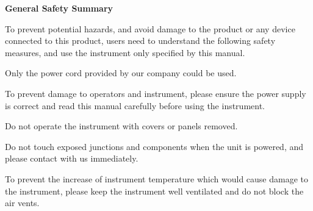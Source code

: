 \noindent\xiaosan\textbf{General Safety Summary}
\vspace{0.7cm}

To prevent potential hazards, and avoid damage to the product or any device connected to this product, users need to understand the following safety measures, and use the instrument only specified by this manual. 

\vspace{0.7cm}
\noindent{}

\vspace{0.2cm}
\hspace{-0.4cm}Only the power cord provided by our company could be used.

\vspace{0.7cm}

\vspace{0.2cm}
\hspace{-0.4cm}To prevent damage to operators and instrument, please ensure the power supply is correct and read this manual carefully before using the instrument.

\vspace{0.7cm}

\vspace{0.2cm}
\hspace{-0.4cm}Do not operate the instrument with covers or panels removed.

\vspace{0.7cm}

\vspace{0.2cm}
\hspace{-0.4cm}Do not touch exposed junctions and components when the unit is powered, and please contact with us immediately.

\vspace{0.7cm}

\vspace{0.2cm}
\hspace{-0.4cm}To prevent the increase of instrument temperature which would cause damage to the instrument, please keep the instrument well ventilated and do not block the air vents.  

